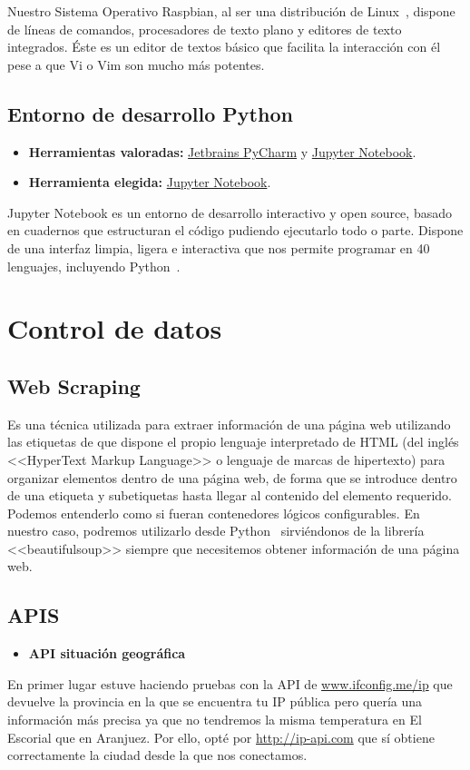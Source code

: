 Nuestro Sistema Operativo Raspbian\cite{misc:RbPWeb}, al ser una distribución de Linux~\cite{misc:Linux}, dispone de líneas de comandos, procesadores de texto plano y editores de texto integrados. Éste es un editor de textos básico que facilita la interacción con él pese a que Vi o Vim son mucho más potentes.

\subsection{Entorno de desarrollo Python}\label{4:Python}
\begin{itemize}
    \item \textbf{Herramientas valoradas:} \href{https://www.jetbrains.com/es-es/pycharm/}{Jetbrains PyCharm} y \href{https://jupyter.org/}{Jupyter Notebook}.
    \item \textbf{Herramienta elegida:} \href{https://jupyter.org/}{Jupyter Notebook}.
\end{itemize}

Jupyter Notebook es un entorno de desarrollo interactivo y open source, basado en cuadernos que estructuran el código pudiendo ejecutarlo todo o parte. Dispone de una interfaz limpia, ligera e interactiva que nos permite programar en 40 lenguajes, incluyendo Python~\cite{misc:Python}.

\section{Control de datos}
\subsection{Web Scraping}\label{4:WebScraping}
Es una técnica utilizada para extraer información de una página web utilizando las etiquetas de que dispone el propio lenguaje interpretado de HTML (del inglés <<HyperText Markup Language>> o lenguaje de marcas de hipertexto) para organizar elementos dentro de una página web, de forma que se introduce dentro de una etiqueta y subetiquetas hasta llegar al contenido del elemento requerido. Podemos entenderlo como si fueran contenedores lógicos configurables.
En nuestro caso, podremos utilizarlo desde Python~\cite{misc:Python} sirviéndonos de la librería <<beautifulsoup>> siempre que necesitemos obtener información de una página web.

\subsection{APIS}\label{4:APIS}
\begin{itemize}
    \item \textbf{API situación geográfica}
\end{itemize}
En primer lugar estuve haciendo pruebas con la API de \url{www.ifconfig.me/ip} que devuelve la provincia en la que se encuentra tu IP pública pero quería una información más precisa ya que no tendremos la misma temperatura en El Escorial que en Aranjuez. Por ello, opté por \url{http://ip-api.com} que sí obtiene correctamente la ciudad desde la que nos conectamos.

